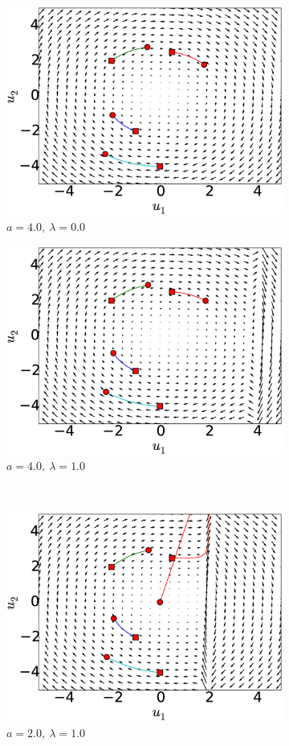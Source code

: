 \documentclass[14pt, a4paper]{extreport}
\begin{document}
%
\begin{figure}[H]
	\centering
	\begin{subfigure}[h]{8.0 cm}
		\includegraphics[width=8.0 cm]{figure/phase_a40_lambda0.eps}
		\caption{$a=4.0,\ \lambda = 0.0$}
	\end{subfigure}
	\begin{subfigure}[h]{8.0 cm}
        \includegraphics[width=8.0 cm]{figure/phase_a40_lambda10.eps}
		\caption{$a=4.0,\ \lambda = 1.0$}
    \end{subfigure}
    \\
    \begin{subfigure}[h]{8.0 cm}
		\includegraphics[width=8.0 cm]{figure/phase_a20_lambda10.eps}
		\caption{$a=2.0,\ \lambda = 1.0$}
	\end{subfigure}
	\begin{subfigure}[h]{8.0 cm}

\end{subfigure}
\end{figure}
\end{document}

